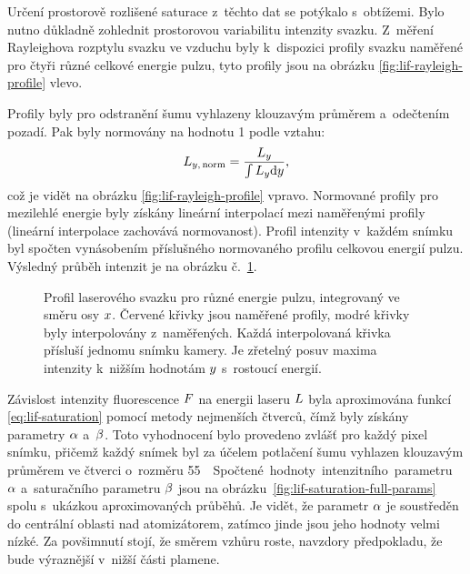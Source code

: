 Určení prostorově rozlišené saturace z~těchto dat se potýkalo s~obtížemi.
Bylo nutno důkladně zohlednit prostorovou variabilitu intenzity svazku.
Z~měření Rayleighova rozptylu svazku ve vzduchu byly k~dispozici
profily svazku naměřené pro čtyři různé celkové energie pulzu,
tyto profily jsou na obrázku \ref{fig:lif-rayleigh-profile} vlevo.

Profily byly pro odstranění šumu vyhlazeny klouzavým průměrem
a~odečtením pozadí.
Pak byly normovány na hodnotu 1 podle vztahu:
\begin{equation}
	L_{y,\,\text{norm}} = \frac{L_y}{\int L_y \mathrm{d}y},
\end{equation}
což je vidět na obrázku \ref{fig:lif-rayleigh-profile} vpravo.
Normované profily pro mezilehlé energie byly získány lineární interpolací
mezi naměřenými profily (lineární interpolace zachovává normovanost).
Profil intenzity v~každém snímku byl spočten vynásobením příslušného
normovaného profilu celkovou energií pulzu.
Výsledný průběh intenzit je na obrázku
č.~\ref{fig:lif-saturation-full-profile}.

\begin{figure}[htp]
	\centering
	
	\caption{Profil laserového svazku pro různé energie pulzu,
		integrovaný ve směru osy $x$.
		Červené křivky jsou naměřené profily,
		modré křivky byly interpolovány z~naměřených.
		Každá interpolovaná křivka přísluší jednomu snímku kamery.
		Je zřetelný posuv maxima intenzity k~nižším hodnotám $y$
		s~rostoucí energií.}
	\label{fig:lif-saturation-full-profile}
\end{figure}

Závislost intenzity fluorescence $F$ na energii laseru $L$
byla aproximována funkcí \eqref{eq:lif-saturation} pomocí metody
nejmenších čtverců, čímž byly získány parametry $\alpha$ a~$\beta$.
Toto vyhodnocení bylo provedeno zvlášť pro každý pixel snímku,
přičemž každý snímek byl za účelem potlačení šumu vyhlazen klouzavým
průměrem ve čtverci o~rozměru \num{5}\times\SI{5}\pixel.

Spočtené hodnoty intenzitního parametru $\alpha$ a~saturačního
parametru $\beta$ jsou na obrázku~\ref{fig:lif-saturation-full-params}
spolu s~ukázkou aproximovaných průběhů.
Je vidět, že parametr $\alpha$ je soustředěn do centrální oblasti
nad atomizátorem, zatímco jinde jsou jeho hodnoty velmi nízké.
Za povšimnutí stojí, že směrem vzhůru roste, navzdory předpokladu,
že bude výraznější v~nižší části plamene.

